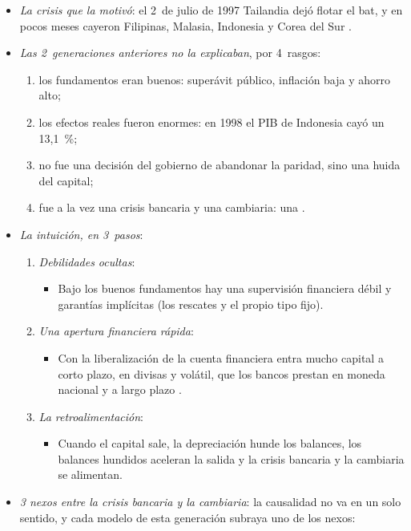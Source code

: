 \documentclass[11pt]{article}
\begin{document}
\begin{itemize}
\item \emph{La crisis que la motivó}: el 2~de julio de 1997 Tailandia dejó flotar el bat, y en pocos meses cayeron Filipinas, Malasia, Indonesia y Corea del Sur\nocite{FMI1997WEOdic} .
\item \emph{Las 2~generaciones anteriores no la explicaban}, por 4~rasgos:
  \begin{enumerate}
  \item los fundamentos eran buenos: superávit público, inflación baja y ahorro alto;
  \item los efectos reales fueron enormes: en 1998 el PIB de Indonesia cayó un 13,1~\%\nocite{FMI2026WEOdatos};
  \item no fue una decisión del gobierno de abandonar la paridad, sino una huida del capital;
  \item fue a la vez una crisis bancaria y una cambiaria: una .
  \end{enumerate}
\item \emph{La intuición, en 3~pasos}:
  \begin{enumerate}
  \item \emph{Debilidades ocultas}:
    \begin{itemize}
    \item Bajo los buenos fundamentos hay una supervisión financiera débil y garantías implícitas (los rescates y el propio tipo fijo).
    \end{itemize}
  \item \emph{Una apertura financiera rápida}:
    \begin{itemize}
    \item Con la liberalización de la cuenta financiera entra mucho capital a corto plazo, en divisas y volátil, que los bancos prestan en moneda nacional y a largo plazo  .
    \end{itemize}
  \item \emph{La retroalimentación}:
    \begin{itemize}
    \item Cuando el capital sale, la depreciación hunde los balances, los balances hundidos aceleran la salida y la crisis bancaria y la cambiaria se alimentan.
    \end{itemize}
  \end{enumerate}
\item \emph{3 nexos entre la crisis bancaria y la cambiaria}: la causalidad no va en un solo sentido, y cada modelo de esta generación subraya uno de los nexos:

\end{itemize}
\end{document}
